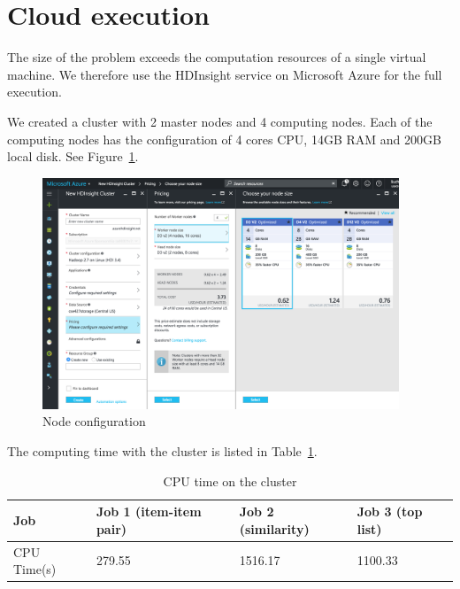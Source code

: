 \section{Cloud execution}
The size of the problem exceeds the computation resources of a single
virtual machine. We therefore use the HDInsight service on Microsoft
Azure for the full execution.

We created a cluster with 2 master nodes and 4 computing nodes. Each of
the computing nodes has the configuration of 4 cores CPU, 14GB RAM and
200GB local disk. See Figure~\ref{fig:node}.
\begin{figure}[!ht]
  \centering
  \includegraphics[width=0.95\textwidth]{images/node}
  \caption{Node configuration}
  \label{fig:node}
\end{figure}

The computing time with the cluster is listed in Table~\ref{tab:clustertime}.
\begin{table}[!ht]
  \centering
  \begin{tabular}{|p{2.5cm}|p{4cm}|p{3cm}|p{3cm}|}
    \hline
    Job & Job 1 (item-item pair) & Job 2 (similarity) & Job 3 (top list)\\
    \hline
    CPU Time(s) & 279.55 & 1516.17 & 1100.33\\
    \hline
  \end{tabular}
  \caption{CPU time on the cluster}
  \label{tab:clustertime}
\end{table}
